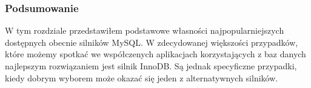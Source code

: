 \subsubsection{Podsumowanie}

W tym rozdziale przedstawiłem podstawowe własności najpopularniejszych dostępnych obecnie silników MySQL. W zdecydowanej większości przypadków, które możemy spotkać we współczenych aplikacjach korzystających z baz danych najlepszym rozwiązaniem jest silnik InnoDB. Są jednak specyficzne przypadki, kiedy dobrym wyborem może okazać się jeden z alternatywnych silników.